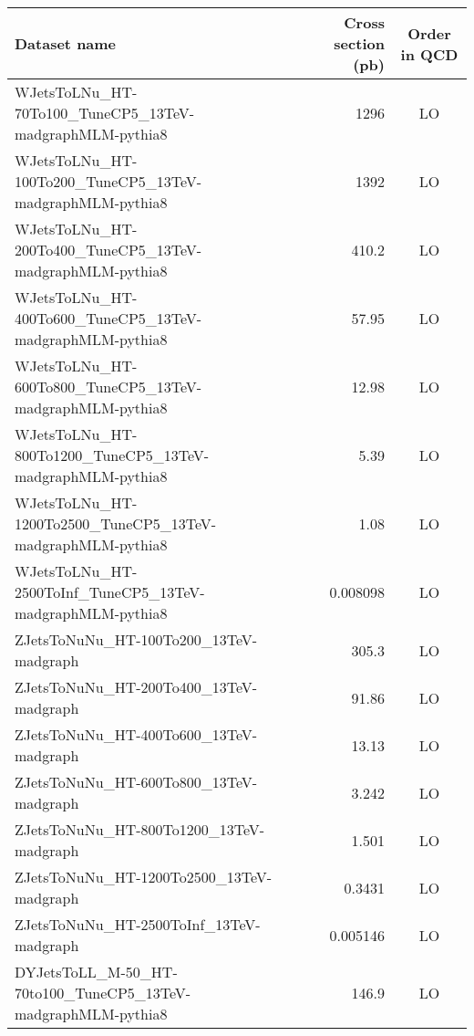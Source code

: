 \begin{table}[ht!]
\centering
\scriptsize
    \def\arraystretch{1.3}
\begin{tabular}{l|r|c}
\hline
\hline
Dataset name                                                                  &  Cross section (pb)          & Order in QCD \\
\hline
\hline
WJetsToLNu\_HT-70To100\_TuneCP5\_13TeV-madgraphMLM-pythia8                        &   1296         & LO  \\
WJetsToLNu\_HT-100To200\_TuneCP5\_13TeV-madgraphMLM-pythia8                       &   1392         & LO  \\
WJetsToLNu\_HT-200To400\_TuneCP5\_13TeV-madgraphMLM-pythia8                       &    410.2       & LO  \\
WJetsToLNu\_HT-400To600\_TuneCP5\_13TeV-madgraphMLM-pythia8                       &     57.95      & LO  \\
WJetsToLNu\_HT-600To800\_TuneCP5\_13TeV-madgraphMLM-pythia8                       &     12.98      & LO  \\
WJetsToLNu\_HT-800To1200\_TuneCP5\_13TeV-madgraphMLM-pythia8                      &      5.39      & LO  \\
WJetsToLNu\_HT-1200To2500\_TuneCP5\_13TeV-madgraphMLM-pythia8                     &      1.08      & LO  \\
WJetsToLNu\_HT-2500ToInf\_TuneCP5\_13TeV-madgraphMLM-pythia8                      &      0.008098  & LO  \\
\hline
ZJetsToNuNu\_HT-100To200\_13TeV-madgraph                                         &    305.3       & LO  \\
ZJetsToNuNu\_HT-200To400\_13TeV-madgraph                                         &     91.86      & LO  \\
ZJetsToNuNu\_HT-400To600\_13TeV-madgraph                                         &     13.13      & LO  \\
ZJetsToNuNu\_HT-600To800\_13TeV-madgraph                                         &      3.242     & LO  \\
ZJetsToNuNu\_HT-800To1200\_13TeV-madgraph                                        &      1.501     & LO  \\
ZJetsToNuNu\_HT-1200To2500\_13TeV-madgraph                                       &      0.3431    & LO  \\
ZJetsToNuNu\_HT-2500ToInf\_13TeV-madgraph                                        &      0.005146  & LO  \\
\hline
DYJetsToLL\_M-50\_HT-70to100\_TuneCP5\_13TeV-madgraphMLM-pythia8                   &    146.9       & LO  \\

\end{tabular}
\end{table}
